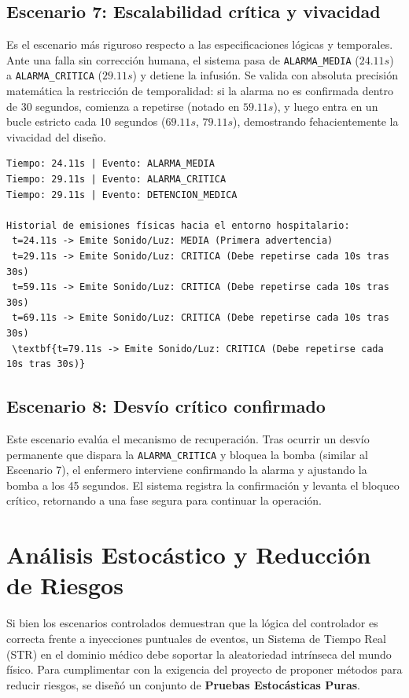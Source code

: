 \subsection{Escenario 7: Escalabilidad crítica y vivacidad}
Es el escenario más riguroso respecto a las especificaciones lógicas y temporales. Ante una falla sin corrección humana, el sistema pasa de \texttt{ALARMA\_MEDIA} ($24.11s$) a \texttt{ALARMA\_CRITICA} ($29.11s$) y detiene la infusión. Se valida con absoluta precisión matemática la restricción de temporalidad: si la alarma no es confirmada dentro de 30 segundos, comienza a repetirse (notado en $59.11s$), y luego entra en un bucle estricto cada 10 segundos ($69.11s$, $79.11s$), demostrando fehacientemente la vivacidad del diseño.
\begin{verbatim}
Tiempo: 24.11s | Evento: ALARMA_MEDIA
Tiempo: 29.11s | Evento: ALARMA_CRITICA
Tiempo: 29.11s | Evento: DETENCION_MEDICA

Historial de emisiones físicas hacia el entorno hospitalario:
 t=24.11s -> Emite Sonido/Luz: MEDIA (Primera advertencia)
 t=29.11s -> Emite Sonido/Luz: CRITICA (Debe repetirse cada 10s tras 30s)
 t=59.11s -> Emite Sonido/Luz: CRITICA (Debe repetirse cada 10s tras 30s)
 t=69.11s -> Emite Sonido/Luz: CRITICA (Debe repetirse cada 10s tras 30s)
 \textbf{t=79.11s -> Emite Sonido/Luz: CRITICA (Debe repetirse cada 10s tras 30s)}
\end{verbatim}

\subsection{Escenario 8: Desvío crítico confirmado}
Este escenario evalúa el mecanismo de recuperación. Tras ocurrir un desvío permanente que dispara la \texttt{ALARMA\_CRITICA} y bloquea la bomba (similar al Escenario 7), el enfermero interviene confirmando la alarma y ajustando la bomba a los 45 segundos. El sistema registra la confirmación y levanta el bloqueo crítico, retornando a una fase segura para continuar la operación.

\section{Análisis Estocástico y Reducción de Riesgos}

Si bien los escenarios controlados demuestran que la lógica del controlador es correcta frente a inyecciones puntuales de eventos, un Sistema de Tiempo Real (STR) en el dominio médico debe soportar la aleatoriedad intrínseca del mundo físico. Para cumplimentar con la exigencia del proyecto de proponer métodos para reducir riesgos, se diseñó un conjunto de \textbf{Pruebas Estocásticas Puras}. 

